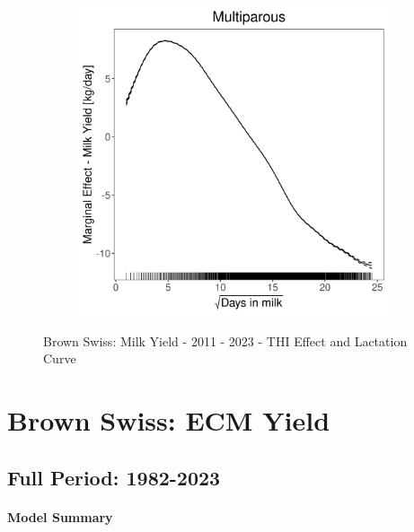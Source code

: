 \begin{figure}[H]
\begin{subfigure}[b]{0.45\textwidth}
    \end{subfigure}
    \hspace{0.05\textwidth} %
    \begin{subfigure}[b]{0.45\textwidth}
        \centering
        \includegraphics[width=\textwidth]{thesis/figures/models/milk/after2010/bs_milk_after2010/bs_milk_after2010_marginal_dim_milk_multi.png}
    \end{subfigure}
    \caption[]{Brown Swiss: Milk Yield - 2011 - 2023 - THI Effect and Lactation Curve}
    \label{fig:main}
\end{figure}

\section{Brown Swiss: ECM Yield}
\subsection{Full Period: 1982-2023}\label{model:bs_ecm_full}
\paragraph{Model Summary} \quad \\



